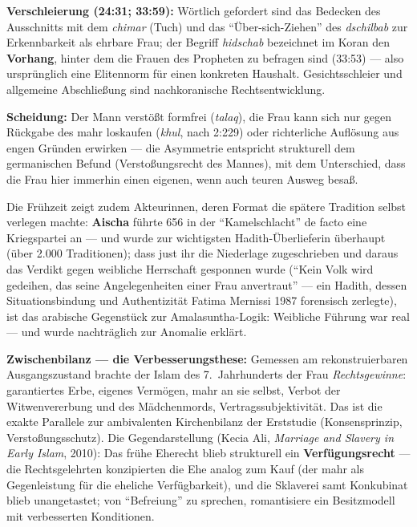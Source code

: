 \documentclass[11pt,a4paper,ngerman]{scrartcl}
\newcommand{\chipbase}[2]{\hspace{0pt}{\footnotesize\textcolor{#1}{[\textsc{#2}]}}}
\newcommand{\chipbelegt}[1]{\chipbase{chipgreen}{#1}}
\newcommand{\chipplausibel}[1]{\chipbase{chipamber}{#1}}
\newcommand{\chipumstritten}[1]{\chipbase{chipred}{#1}}
\begin{document}
\textbf{Verschleierung (24:31; 33:59):} Wörtlich gefordert sind das Bedecken des Ausschnitts mit dem \emph{chimar} (Tuch) und das \enquote{Über-sich-Ziehen} des \emph{dschilbab} zur Erkennbarkeit als ehrbare Frau; der Begriff \emph{hidschab} bezeichnet im Koran den \textbf{Vorhang}, hinter dem die Frauen des Propheten zu befragen sind (33:53) --- also ursprünglich eine Elitennorm für einen konkreten Haushalt. Gesichtsschleier und allgemeine Abschließung sind nachkoranische Rechtsentwicklung. \chipbelegt{belegt}

\textbf{Scheidung:} Der Mann verstößt formfrei (\emph{talaq}), die Frau kann sich nur gegen Rückgabe des mahr loskaufen (\emph{khul}, nach 2:229) oder richterliche Auflösung aus engen Gründen erwirken --- die Asymmetrie entspricht strukturell dem germanischen Befund (Verstoßungsrecht des Mannes), mit dem Unterschied, dass die Frau hier immerhin einen eigenen, wenn auch teuren Ausweg besaß. \chipbelegt{belegt}

Die Frühzeit zeigt zudem Akteurinnen, deren Format die spätere Tradition selbst verlegen machte: \textbf{Aischa} führte 656 in der \enquote{Kamelschlacht} de facto eine Kriegspartei an --- und wurde zur wichtigsten Hadith-Überlieferin überhaupt (über 2.000 Traditionen); dass just ihr die Niederlage zugeschrieben und daraus das Verdikt gegen weibliche Herrschaft gesponnen wurde (\enquote{Kein Volk wird gedeihen, das seine Angelegenheiten einer Frau anvertraut} --- ein Hadith, dessen Situationsbindung und Authentizität Fatima Mernissi 1987 forensisch zerlegte), ist das arabische Gegenstück zur Amalasuntha-Logik: Weibliche Führung war real --- und wurde nachträglich zur Anomalie erklärt. \chipplausibel{plausibel}

\textbf{Zwischenbilanz --- die Verbesserungsthese:} Gemessen am rekonstruierbaren Ausgangszustand brachte der Islam des 7.~Jahrhunderts der Frau \emph{Rechtsgewinne}: garantiertes Erbe, eigenes Vermögen, mahr an sie selbst, Verbot der Witwenvererbung und des Mädchenmords, Vertragssubjektivität. Das ist die exakte Parallele zur ambivalenten Kirchenbilanz der Erststudie (Konsensprinzip, Verstoßungsschutz). \chipplausibel{plausibel} Die Gegendarstellung (Kecia Ali, \emph{Marriage and Slavery in Early Islam}, 2010): Das frühe Eherecht blieb strukturell ein \textbf{Verfügungsrecht} --- die Rechtsgelehrten konzipierten die Ehe analog zum Kauf (der mahr als Gegenleistung für die eheliche Verfügbarkeit), und die Sklaverei samt Konkubinat blieb unangetastet; von \enquote{Befreiung} zu sprechen, romantisiere ein Besitzmodell mit verbesserten Konditionen. \chipumstritten{umstritten}
\end{document}
